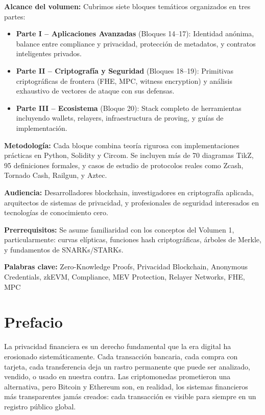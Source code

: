 \documentclass[11pt,a4paper,twoside]{book}
\theoremstyle{definition}
\theoremstyle{remark}
\begin{document}
\textbf{Alcance del volumen:} Cubrimos siete bloques temáticos organizados en tres partes:

\begin{itemize}
    \item \textbf{Parte I -- Aplicaciones Avanzadas} (Bloques 14--17): Identidad anónima, balance entre compliance y privacidad, protección de metadatos, y contratos inteligentes privados.
    
    \item \textbf{Parte II -- Criptografía y Seguridad} (Bloques 18--19): Primitivas criptográficas de frontera (FHE, MPC, witness encryption) y análisis exhaustivo de vectores de ataque con sus defensas.
    
    \item \textbf{Parte III -- Ecosistema} (Bloque 20): Stack completo de herramientas incluyendo wallets, relayers, infraestructura de proving, y guías de implementación.
\end{itemize}

\textbf{Metodología:} Cada bloque combina teoría rigurosa con implementaciones prácticas en Python, Solidity y Circom. Se incluyen más de 70 diagramas TikZ, 95 definiciones formales, y casos de estudio de protocolos reales como Zcash, Tornado Cash, Railgun, y Aztec.

\textbf{Audiencia:} Desarrolladores blockchain, investigadores en criptografía aplicada, arquitectos de sistemas de privacidad, y profesionales de seguridad interesados en tecnologías de conocimiento cero.

\textbf{Prerrequisitos:} Se asume familiaridad con los conceptos del Volumen 1, particularmente: curvas elípticas, funciones hash criptográficas, árboles de Merkle, y fundamentos de SNARKs/STARKs.

\vspace{0.5cm}

\noindent\textbf{Palabras clave:} Zero-Knowledge Proofs, Privacidad Blockchain, Anonymous Credentials, zkEVM, Compliance, MEV Protection, Relayer Networks, FHE, MPC

\clearpage

\chapter*{Prefacio}

La privacidad financiera es un derecho fundamental que la era digital ha erosionado sistemáticamente. Cada transacción bancaria, cada compra con tarjeta, cada transferencia deja un rastro permanente que puede ser analizado, vendido, o usado en nuestra contra. Las criptomonedas prometieron una alternativa, pero Bitcoin y Ethereum son, en realidad, los sistemas financieros más transparentes jamás creados: cada transacción es visible para siempre en un registro público global.
\end{document}
